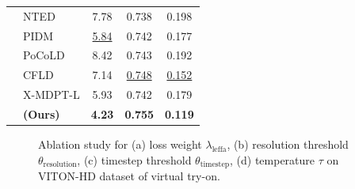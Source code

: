 \begin{table}[!t]
{\begin{tabular}{clccc}
                                    & NTED \citep{ren2022neural}             & 7.78  & 0.738 & 0.198 \\
                                    & PIDM \citep{bhunia2023person}          & \underline{5.84}  & 0.742 & 0.177 \\
                                    & PoCoLD \citep{han2023controllable}     & 8.42  & 0.743 & 0.192 \\
                                    & CFLD \citep{lu2024coarse}              & 7.14  & \underline{0.748} & \underline{0.152} \\
                                    & X-MDPT-L \citep{pham2024cross}         & 5.93  & 0.742 & 0.179 \\
                                    & \textbf{\leffa{} (Ours)} & \textbf{4.23}  & \textbf{0.755} & \textbf{0.119} \\
\bottomrule[1.5pt]
\end{tabular}
}
\label{leffa:tab:deepfashion}
\end{table}


\begin{figure}[!ht]
    \centering
    \begin{subfigure}{0.251\textwidth}
        \centering
        \resizebox{\linewidth}{!}{{}}
        \label{subfig:ablation_1}
    \end{subfigure}\hfill
    \begin{subfigure}{0.249\textwidth}
        \centering
        \resizebox{\linewidth}{!}{{}}
        \label{subfig:ablation_2}
    \end{subfigure}\hfill
    \begin{subfigure}{0.249\textwidth}
        \centering
        \resizebox{\linewidth}{!}{{}}
        \label{subfig:ablation_3}
    \end{subfigure}\hfill
    \begin{subfigure}{0.249\textwidth}
        \centering
        \resizebox{\linewidth}{!}{{}}
        \label{subfig:ablation_4}
    \end{subfigure}
    \caption{Ablation study for (a) \leffa{} loss weight $\lambda_{\text{leffa}}$, (b) resolution threshold $\theta_{\text{resolution}}$, (c) timestep threshold $\theta_{\text{timestep}}$, (d) temperature $\tau$ on VITON-HD dataset of virtual try-on.}
    \label{leffa:fig:ablation}
\end{figure}


